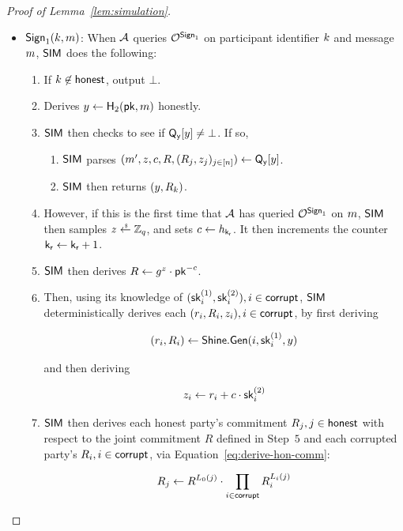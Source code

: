 \begin{proof}[Proof of Lemma~\ref{lem:simulation}]
  \begin{itemize}
    \item \underline{$\mathsf{Sign}_1(k, m)$}:
      When $\mathcal{A}$ queries $\mathcal{O}^{\mathsf{Sign}_1}$ on participant identifier $k$ and message $m$,
      $\mathsf{SIM}$ does the following:
      \begin{enumerate}
        \item If $k \not\in \mathsf{honest}$, output $\bot$.
        \item Derives $y \gets \mathsf{H}_2(\mathsf{pk}, m)$ honestly.
        \item $\mathsf{SIM}$ then checks to see if $ \mathsf{Q_y}[y] \neq \bot$.
        If so,
        \begin{enumerate}
          \item $\mathsf{SIM}$ parses $(m', z, c, R, (R_j, z_j)_{j \in [n]}) \gets \mathsf{Q_y}[y]$.
      \item $\mathsf{SIM}$ then returns $(y, R_k)$.
      \end{enumerate}
      \item However, if this is the first time that $\mathcal{A}$ has queried $\mathcal{O}^{\mathsf{Sign}_1}$ on $m$,
        $\mathsf{SIM}$ then samples $z \rgets \Zq$,
        and sets $c \gets h_{\mathsf{k_r}}$.
        It then increments the counter $\mathsf{k_r} \gets \mathsf{k_r} + 1$.
        \item $\mathsf{SIM}$ then derives $R \gets g^z \cdot \mathsf{pk}^{-c}$.
        \item Then, using its knowledge of $(\mathsf{sk}^{(1)}_i,\mathsf{sk}^{(2)}_i), i \in \mathsf{corrupt}$,
        $\mathsf{SIM}$ deterministically derives each $(r_i, R_i, z_i), i \in \mathsf{corrupt}$,
        by first deriving

          \[
            (r_i, R_i) \gets \mathsf{Shine}.\mathsf{Gen}(i, \mathsf{sk}^{(1)}_i, y)
          \]

        and then deriving

          \[
            z_i \gets r_i + c \cdot \mathsf{sk}^{(2)}_i
          \]

        \item $\mathsf{SIM}$ then derives each honest party's commitment $R_j, j \in \mathsf{honest}$ with respect to the  joint commitment $R$ defined in Step~$5$ and each corrupted party's $R_i, i \in \mathsf{corrupt}$,
          via Equation~\ref{eq:derive-hon-comm}:

          \begin{equation} \label{eq:derive-hon-comm}
            R_j \gets R^{L_0(j)} \cdot \prod_{i \in \mathsf{corrupt}} R_i^{L_i(j)}
          \end{equation}


\end{enumerate}
\end{itemize}
\end{proof}

